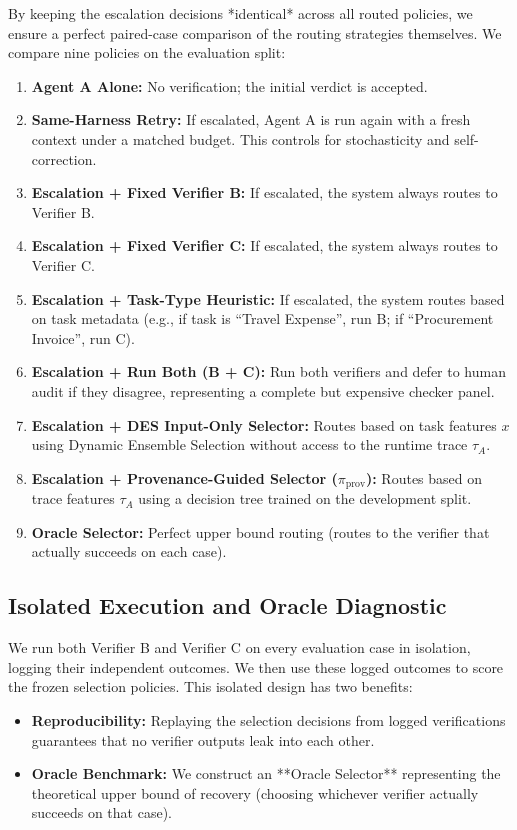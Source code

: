 \documentclass[manuscript,screen,nonacm]{acmart}
\begin{document}
By keeping the escalation decisions *identical* across all routed policies, we ensure a perfect paired-case comparison of the routing strategies themselves. We compare nine policies on the evaluation split:
\begin{enumerate}
    \item \textbf{Agent A Alone:} No verification; the initial verdict is accepted.
    \item \textbf{Same-Harness Retry:} If escalated, Agent A is run again with a fresh context under a matched budget. This controls for stochasticity and self-correction.
    \item \textbf{Escalation + Fixed Verifier B:} If escalated, the system always routes to Verifier B.
    \item \textbf{Escalation + Fixed Verifier C:} If escalated, the system always routes to Verifier C.
    \item \textbf{Escalation + Task-Type Heuristic:} If escalated, the system routes based on task metadata (e.g., if task is ``Travel Expense'', run B; if ``Procurement Invoice'', run C).
    \item \textbf{Escalation + Run Both (B + C):} Run both verifiers and defer to human audit if they disagree, representing a complete but expensive checker panel.
    \item \textbf{Escalation + DES Input-Only Selector:} Routes based on task features $x$ using Dynamic Ensemble Selection without access to the runtime trace $\tau_A$.
    \item \textbf{Escalation + Provenance-Guided Selector ($\pi_{\text{prov}}$):} Routes based on trace features $\tau_A$ using a decision tree trained on the development split.
    \item \textbf{Oracle Selector:} Perfect upper bound routing (routes to the verifier that actually succeeds on each case).
\end{enumerate}

\subsection{Isolated Execution and Oracle Diagnostic}
We run both Verifier B and Verifier C on every evaluation case in isolation, logging their independent outcomes. We then use these logged outcomes to score the frozen selection policies. This isolated design has two benefits:
\begin{itemize}
    \item \textbf{Reproducibility:} Replaying the selection decisions from logged verifications guarantees that no verifier outputs leak into each other.
    \item \textbf{Oracle Benchmark:} We construct an **Oracle Selector** representing the theoretical upper bound of recovery (choosing whichever verifier actually succeeds on that case).
\end{itemize}
\end{document}
